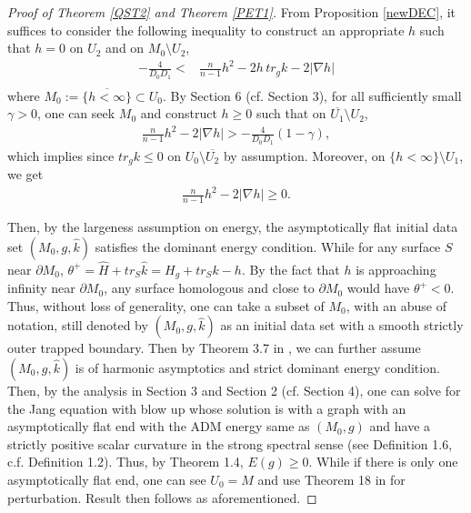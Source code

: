 \documentclass[11pt]{amsart}
\makeatletter
\renewcommand*{\eqref}[1]{%
  \hyperref[{#1}]{\textup{\tagform@{\ref*{#1}}}}%
}
\theoremstyle{remark}
\numberwithin{equation}{section}
\def\p{\partial}
\def\Na{\nabla}
\makeatother
\begin{document}
{{\begin{proof}[Proof of Theorem \ref{QST2} and Theorem \ref{PET1}]

From Proposition \ref{newDEC}, it suffices to consider the following inequality to construct an appropriate $h$ such that $h=0$ on $U_2$ and on $M_0\setminus U_2$, 
\begin{equation}\label{stability1}
\begin{split}
- \frac{4}{D_0D_1}<&\frac{n}{n-1}h^2-2h\,tr_{g} k -2|\Na h|\\ 
\end{split}
\end{equation}
where $M_0:=\overline{\{h<\infty\}}\subset U_0$. 
By \cite{LLU22} Section 6 (cf. \cite{LUY21} Section 3), for all sufficiently small $\gamma>0$, one can seek $M_0$ and construct $h\geq 0$ such that on $\overline{U_1}\setminus U_2$, 
\begin{equation}\label{stability2}
\begin{split}
\frac{n}{n-1}h^2 -2|\Na h|> - \frac{4}{D_0D_1}(1-\gamma), 
\end{split}
\end{equation} 
which implies \eqref{stability1} since $tr_g k\leq 0$ on $U_0\setminus \overline{U_2}$ by assumption.  Moreover, on $\{h<\infty\}\setminus U_1$, we get 
\begin{equation}\label{stability3}
\begin{split}
\frac{n}{n-1}h^2 -2|\Na h|\geq0.  
\end{split}
\end{equation} 

Then, by the largeness assumption on energy,  the asymptotically flat initial data set $(M_0,g,\hat k)$ satisfies the dominant energy condition.  While for any surface $S$ near $\p M_0$,  $\theta^+=\hat H+tr_{S} \hat k= H_g + tr_{S}k -h$. 
By the fact that $h$ is approaching infinity near $\p M_0$, any surface homologous and close to $\p M_0$ would have $\theta^+<0$.  Thus, without loss of generality,  one can take a subset of $M_0$, with an abuse of notation, still denoted by $(M_0, g, \hat k)$ as an initial data set with a smooth strictly outer trapped boundary.  Then by Theorem 3.7 in \cite{LLU21} , we can further assume $(M_0,g,\hat k)$ is of harmonic asymptotics and strict dominant energy condition.  Then, by the analysis in \cite{E10} Section 3 and \cite{E3} Section 2 (cf. \cite{SY2} Section 4), one can solve for the Jang equation with blow up whose solution is with a graph with an asymptotically flat end with the ADM energy same as $(M_0,g)$ and have a strictly positive scalar curvature in the strong spectral sense (see \cite{HSY} Definition 1.6, c.f.  \cite{BW1} Definition 1.2).  Thus, by \cite{BW1} Theorem 1.4, $E(g)\geq 0$.  While if there is only one asymptotically flat end, one can see $U_0=M$ and use Theorem 18 in \cite{EHLS} for perturbation. Result then follows as aforementioned.  
\end{proof} 

}}
\end{document}
